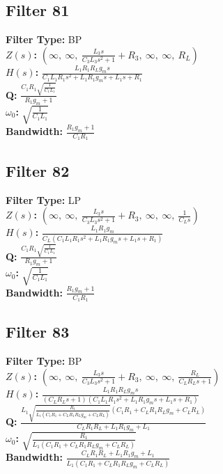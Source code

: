 \documentclass{article}
\begin{document}
\subsection*{Filter 81}
\textbf{Filter Type:} BP \\ 
\textbf{$Z(s)$:} $\left( \infty, \  \infty, \  \frac{L_{3} s}{C_{3} L_{3} s^{2} + 1} + R_{3}, \  \infty, \  \infty, \  R_{L}\right)$ \\ 
\textbf{$H(s)$:} $\frac{L_{1} R_{1} R_{L} g_{m} s}{C_{1} L_{1} R_{1} s^{2} + L_{1} R_{1} g_{m} s + L_{1} s + R_{1}}$ \\ 
\textbf{Q:} $\frac{C_{1} R_{1} \sqrt{\frac{1}{C_{1} L_{1}}}}{R_{1} g_{m} + 1}$ \\ 
\textbf{$\omega_0$:} $\sqrt{\frac{1}{C_{1} L_{1}}}$ \\ 
\textbf{Bandwidth:} $\frac{R_{1} g_{m} + 1}{C_{1} R_{1}}$ \\ 
\subsection*{Filter 82}
\textbf{Filter Type:} LP \\ 
\textbf{$Z(s)$:} $\left( \infty, \  \infty, \  \frac{L_{3} s}{C_{3} L_{3} s^{2} + 1} + R_{3}, \  \infty, \  \infty, \  \frac{1}{C_{L} s}\right)$ \\ 
\textbf{$H(s)$:} $\frac{L_{1} R_{1} g_{m}}{C_{L} \left(C_{1} L_{1} R_{1} s^{2} + L_{1} R_{1} g_{m} s + L_{1} s + R_{1}\right)}$ \\ 
\textbf{Q:} $\frac{C_{1} R_{1} \sqrt{\frac{1}{C_{1} L_{1}}}}{R_{1} g_{m} + 1}$ \\ 
\textbf{$\omega_0$:} $\sqrt{\frac{1}{C_{1} L_{1}}}$ \\ 
\textbf{Bandwidth:} $\frac{R_{1} g_{m} + 1}{C_{1} R_{1}}$ \\ 
\subsection*{Filter 83}
\textbf{Filter Type:} BP \\ 
\textbf{$Z(s)$:} $\left( \infty, \  \infty, \  \frac{L_{3} s}{C_{3} L_{3} s^{2} + 1} + R_{3}, \  \infty, \  \infty, \  \frac{R_{L}}{C_{L} R_{L} s + 1}\right)$ \\ 
\textbf{$H(s)$:} $\frac{L_{1} R_{1} R_{L} g_{m} s}{\left(C_{L} R_{L} s + 1\right) \left(C_{1} L_{1} R_{1} s^{2} + L_{1} R_{1} g_{m} s + L_{1} s + R_{1}\right)}$ \\ 
\textbf{Q:} $\frac{L_{1} \sqrt{\frac{R_{1}}{L_{1} \left(C_{1} R_{1} + C_{L} R_{1} R_{L} g_{m} + C_{L} R_{L}\right)}} \left(C_{1} R_{1} + C_{L} R_{1} R_{L} g_{m} + C_{L} R_{L}\right)}{C_{L} R_{1} R_{L} + L_{1} R_{1} g_{m} + L_{1}}$ \\ 
\textbf{$\omega_0$:} $\sqrt{\frac{R_{1}}{L_{1} \left(C_{1} R_{1} + C_{L} R_{1} R_{L} g_{m} + C_{L} R_{L}\right)}}$ \\ 
\textbf{Bandwidth:} $\frac{C_{L} R_{1} R_{L} + L_{1} R_{1} g_{m} + L_{1}}{L_{1} \left(C_{1} R_{1} + C_{L} R_{1} R_{L} g_{m} + C_{L} R_{L}\right)}$ \\ 
\end{document}
